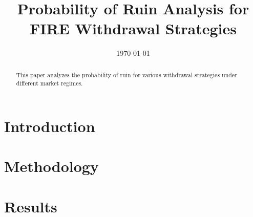 \documentclass[11pt]{article}
\title{Probability of Ruin Analysis for FIRE Withdrawal Strategies}
\author{}
\date{\today}
\begin{document}
\maketitle

\begin{abstract}
This paper analyzes the probability of ruin for various withdrawal strategies
under different market regimes.
\end{abstract}

\section{Introduction}


\section{Methodology}


\section{Results}




\end{document}
